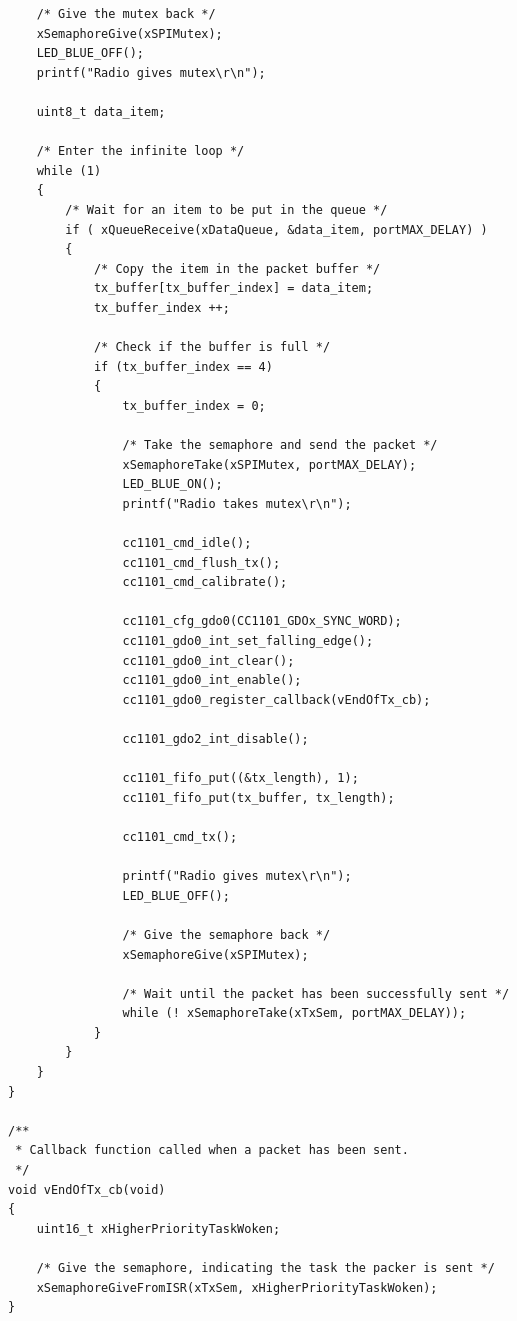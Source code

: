 \documentclass[11pt]{report}
\begin{document}
\begin{verbatim}
    /* Give the mutex back */
    xSemaphoreGive(xSPIMutex);
    LED_BLUE_OFF();
    printf("Radio gives mutex\r\n");
    
    uint8_t data_item;
    
    /* Enter the infinite loop */
    while (1)
    {
        /* Wait for an item to be put in the queue */
        if ( xQueueReceive(xDataQueue, &data_item, portMAX_DELAY) )
        {
            /* Copy the item in the packet buffer */
            tx_buffer[tx_buffer_index] = data_item;
            tx_buffer_index ++;
            
            /* Check if the buffer is full */
            if (tx_buffer_index == 4)
            {
                tx_buffer_index = 0;
                
                /* Take the semaphore and send the packet */
                xSemaphoreTake(xSPIMutex, portMAX_DELAY);
                LED_BLUE_ON();
                printf("Radio takes mutex\r\n");
                
                cc1101_cmd_idle();
                cc1101_cmd_flush_tx();
                cc1101_cmd_calibrate();

                cc1101_cfg_gdo0(CC1101_GDOx_SYNC_WORD);
                cc1101_gdo0_int_set_falling_edge();
                cc1101_gdo0_int_clear();
                cc1101_gdo0_int_enable();
                cc1101_gdo0_register_callback(vEndOfTx_cb);
                
                cc1101_gdo2_int_disable();
                
                cc1101_fifo_put((&tx_length), 1);
                cc1101_fifo_put(tx_buffer, tx_length);
                
                cc1101_cmd_tx();
                
                printf("Radio gives mutex\r\n");
                LED_BLUE_OFF();
                
                /* Give the semaphore back */
                xSemaphoreGive(xSPIMutex);
                
                /* Wait until the packet has been successfully sent */
                while (! xSemaphoreTake(xTxSem, portMAX_DELAY));
            }
        }
    }
}

/**
 * Callback function called when a packet has been sent.
 */
void vEndOfTx_cb(void)
{
    uint16_t xHigherPriorityTaskWoken; 
    
    /* Give the semaphore, indicating the task the packer is sent */
    xSemaphoreGiveFromISR(xTxSem, xHigherPriorityTaskWoken);
}

\end{verbatim}
\end{document}
